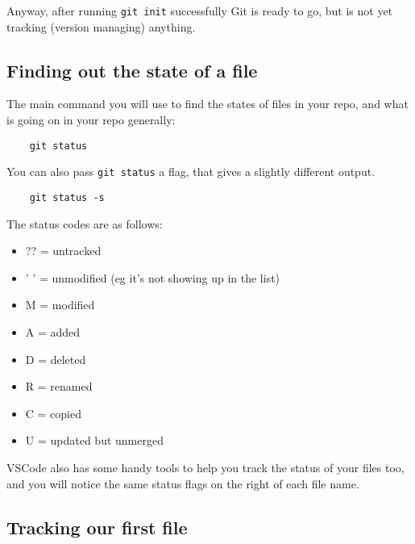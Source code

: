 Anyway, after running \texttt{git init} successfully Git is ready to go, but is not yet tracking (version managing) anything.


\subsection{Finding out the state of a file}

The main command you will use to find the states of files in your repo, and what is going on in your repo generally:

\begin{verbatim}
    git status
\end{verbatim}


You can also pass \texttt{git status} a flag, that gives a slightly different output.

\begin{verbatim}
    git status -s
\end{verbatim}


The status codes are as follows:


\begin{itemize}
	\item ??  = untracked 	
    \item ' ' = unmodified (eg it's not showing up in the list)
    \item M   = modified
    \item A   = added
	\item D   = deleted
	\item R   = renamed
	\item C   = copied
	\item U   = updated but unmerged
\end{itemize}

VSCode also has some handy tools to help you track the status of your files too, and you will notice the same status flags on the right of each file name.
\\



\subsection{Tracking our first file}

